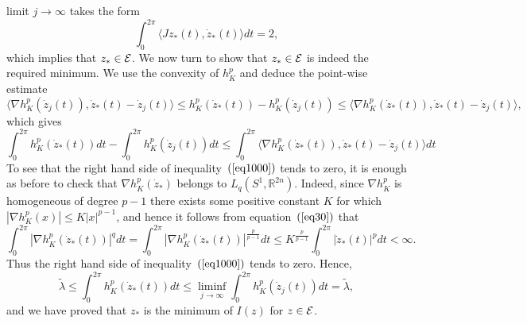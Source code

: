 \documentclass[12pt]{article}
\begin{document}
limit $j \rightarrow \infty$ takes the form
$$ \int_0^{2 \pi} \langle J z_*(t) , \dot{z}_*(t)
 \rangle  dt = 2,$$
which implies that $z_* \in {\cal E}$. We now turn to show that $z_*
\in {\cal E}$ is indeed the required minimum. We use the convexity
of $h_K^p$ and deduce the point-wise estimate
$$ \langle \nabla h_K^p({\dot z}_j(t)), {\dot z}_*(t)-{\dot z}_j(t) \rangle \leq h_K^p({\dot z}_*(t)) -
h_K^p({\dot z}_j(t)) \leq \langle \nabla h_K^p({\dot z}_*(t)), {\dot
z}_*(t)-{\dot z}_j(t) \rangle,$$ which gives
\begin{equation} \label{eq1000} \int_0^{ 2 \pi} h_K^p ({\dot z}_*(t))dt - \int_0^{ 2
\pi} h_K^p ({\dot z}_j(t))dt \leq \int_0^{ 2 \pi} \langle \nabla
h_K^p({\dot z}_*(t)), {\dot z}_*(t)-{\dot z}_j(t) \rangle dt
\end{equation}
To see that the right hand side of inequality~$(\ref{eq1000})$ tends
to zero, it is enough as before to check that
 $\nabla h_K^p({\dot z}_*)$ belongs to $L_q(S^1,{\mathbb
R}^{2n})$. Indeed, since $\nabla h_K^p$ is homogeneous of degree
$p-1$ there exists some positive constant $K$ for which $|\nabla
h_K^p(x)| \leq K |x|^{p-1}$, and hence it follows from
equation~$(\ref{eq30})$ that
$$ \int_0^{2 \pi} |\nabla h_K^p({\dot z}_*(t))|^qdt =  \int_0^{2 \pi}
|\nabla h_K^p({\dot z}_*(t))|^{\frac {p} {p-1}}dt \leq K^{\frac {p}
{p-1}} \int_0^{2 \pi} |{\dot z}_*(t) |^p dt < \infty.$$ Thus the
right hand side of inequality~$(\ref{eq1000})$ tends to zero. Hence,
$$ \tilde \lambda \leq \int_{0}^{2 \pi} h_K^p( {\dot z}_*(t)) dt
\leq \liminf_{j \rightarrow \infty} \int_{0}^{2 \pi} h_K^p( {\dot
z}_j(t)) dt = \tilde \lambda,$$ and we have proved that $z_*$ is the
minimum of $I(z)$ for $z \in {\cal E}$.
\end{document}
